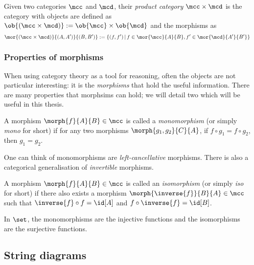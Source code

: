 \begin{example}
    Given two categories \(\mcc\) and \(\mcd\), their \emph{product category}
    \(\mcc \times \mcd\) is the category with objects are defined as \(
        \ob{(\mcc \times \mcd)} := \ob{\mcc} \times \ob{\mcd}
    \) and the morphisms as \[
        \mor{(\mcc \times \mcd)}{(A, A^\prime)}{(B, B^\prime)}
        :=
        \{
            (f, f^\prime)
            \,|\,
            f \in \mor{\mcc}{A}{B},
            f^\prime \in \mor{\mcd}{A^\prime}{B^\prime}
        \}
    \]
\end{example}

\subsubsection{Properties of morphisms}

When using category theory as a tool for reasoning, often the objects are not
particular interesting: it is the \emph{morphisms} that hold the useful
information.
There are many properties that morphsims can hold; we will detail two which will
be useful in this thesis.

\begin{definition}[Monomorphism]
    A morphism \(\morph{f}{A}{B} \in \mcc\) is called a \emph{monomorphism} (or
    simply \emph{mono} for short) if for any two morphisms
    \(\morph{g_1,g_2}{C}{A}\), if \(f \circ g_1 = f \circ g_2\), then
    \(g_1 = g_2\).
\end{definition}

One can think of monomorphisms are \emph{left-cancellative} morphisms.
There is also a categorical generalisation of \emph{invertible} morphisms.

\begin{definition}[Isomorphism]
    A morphism \(\morph{f}{A}{B} \in \mcc\) is called an \emph{isomorphism} (or
    simply \emph{iso} for short) if there also exists a morphism \(
        \morph{\inverse{f}}{B}{A} \in \mcc
    \) such that \(
        \inverse{f} \circ f = \id[A]
    \) and \(
        f \circ \inverse{f} = \id[B]
    \).
\end{definition}

\begin{example}
    In \(\set\), the monomorphisms are the injective functions and the
    isomorphisms are the surjective functions.
\end{example}

\subsection{String diagrams}

